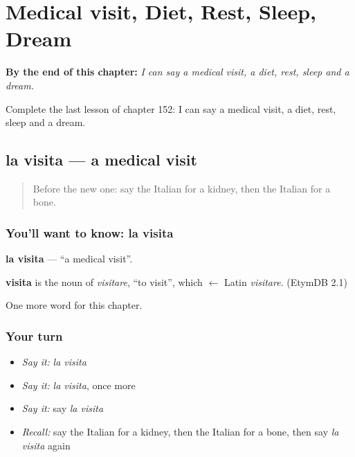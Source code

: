 
\chapter{Medical visit, Diet, Rest, Sleep, Dream}
\label{ch:it-medical-visit-diet-rest-sleep-dream}

\begin{chapteropening}
\textbf{By the end of this chapter:} \emph{I can say a medical visit, a diet, rest, sleep and a dream.}

Complete the last lesson of chapter 152: I can say a medical visit, a diet, rest, sleep and a dream.
\end{chapteropening}

\section[la visita]{la visita — a medical visit}

\label{lesson:IT-C152-visita}



\begin{quote}
Before the new one: say the Italian for a kidney, then the Italian for a bone.
\end{quote}

\subsection*{You'll want to know: la visita}
\textbf{la visita} — \textquotedblleft{}a medical visit\textquotedblright{}.

\begin{cousinweb}
\textbf{visita} is the noun of \emph{visitare}, \textquotedblleft{}to visit\textquotedblright{}, which $\leftarrow$ Latin \emph{visitare}. (EtymDB 2.1)
\end{cousinweb}

\begin{grammarlens}[title={What you've built}]
One more word for this chapter.
\end{grammarlens}

\subsection*{Your turn}
\begin{itemize}
\raggedright
  \item \emph{Say it:} \emph{la visita}
  \item \emph{Say it:} \emph{la visita}, once more
  \item \emph{Say it:} say \emph{la visita}
  \item \emph{Recall:} say the Italian for a kidney, then the Italian for a bone, then say \emph{la visita} again
\end{itemize}

